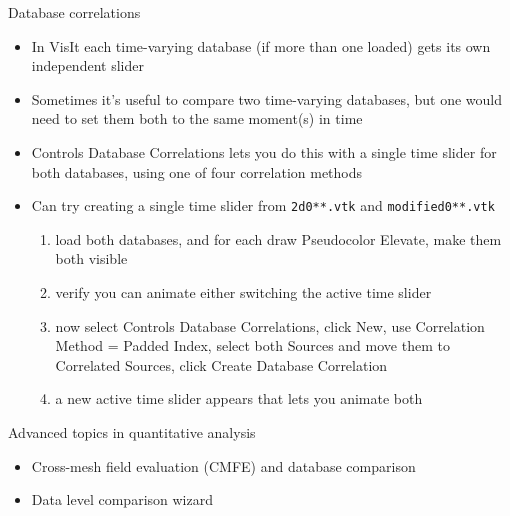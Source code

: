 \begin{frame}{Database correlations}
  \begin{itemize}\setlength{\itemsep}{2mm}
  \item In VisIt each time-varying database (if more than one loaded) gets its own independent slider
  \item Sometimes it's useful to compare two time-varying databases, but one would need to set them both
    to the same moment(s) in time
  \item Controls \ra Database Correlations lets you do this with a single time slider for both databases,
    using one of four correlation methods
    \pause
  \item Can try creating a single time slider from \texttt{2d0**.vtk} and \texttt{modified0**.vtk}
    \begin{enumerate}\setlength{\itemsep}{0mm}
    \item load both databases, and for each draw Pseudocolor \ra Elevate, make them both visible
    \item verify you can animate either switching the active time slider
    \item now select Controls \ra Database Correlations, click New, use Correlation Method = Padded
      Index, select both Sources and move them to Correlated Sources, click Create Database Correlation
    \item a new active time slider appears that lets you animate both
    \end{enumerate}
  \end{itemize}
\end{frame}

\begin{frame}{Advanced topics in quantitative analysis}
  \begin{itemize}\setlength{\itemsep}{3mm}
  \item Cross-mesh field evaluation (CMFE) and database comparison
  \item   Data level comparison wizard
  \end{itemize}
\end{frame}
